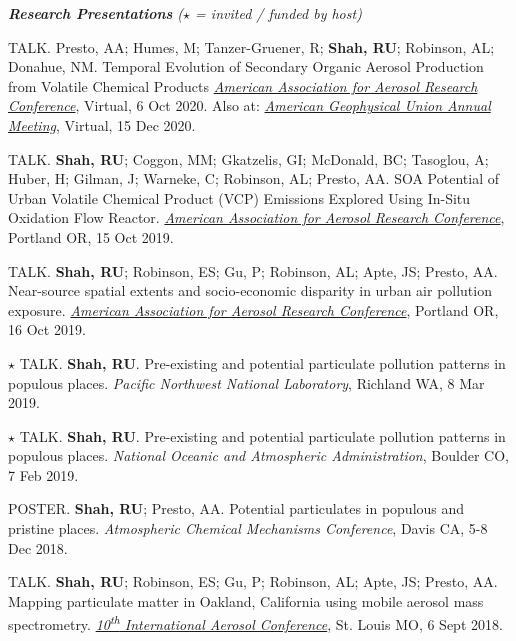 \documentclass{article}
\begin{document}
\hrulefill
\textit{\textbf{  Research Presentations} ({\Large $\star$} = invited / funded by host)  }
\hrulefill
\begin{etaremune}
\item {\tiny TALK.} Presto, AA; Humes, M; Tanzer-Gruener, R; \textbf{Shah, RU}; Robinson, AL; Donahue, NM. 
Temporal Evolution of Secondary Organic Aerosol Production from Volatile Chemical Products \href{http://aaarabstracts.com/2020/viewabstract.php?pid=52}{\textit{American Association for Aerosol Research Conference}}, Virtual, 6 Oct 2020. Also at: \href{https://agu.confex.com/agu/fm20/meetingapp.cgi/Paper/680476}{\textit{American Geophysical Union Annual Meeting}}, Virtual, 15 Dec 2020.
\item {\tiny TALK.} \textbf{Shah, RU}; Coggon, MM; Gkatzelis, GI; McDonald, BC; Tasoglou, A; Huber, H; Gilman, J; Warneke, C; Robinson, AL; Presto, AA. SOA Potential of Urban Volatile Chemical Product (VCP) Emissions Explored Using In-Situ Oxidation Flow Reactor. \href{http://aaarabstracts.com/2019/viewabstract.php?pid=329}{\textit{American Association for Aerosol Research Conference}}, Portland OR, 15 Oct 2019.
\item {\tiny TALK.} \textbf{Shah, RU};  Robinson, ES; Gu, P; Robinson, AL; Apte, JS; Presto, AA. Near-source spatial extents and socio-economic disparity in urban air pollution exposure. \href{http://aaarabstracts.com/2019/viewabstract.php?pid=322}{\textit{American Association for Aerosol Research Conference}}, Portland OR, 16 Oct 2019.
\item {\Large $\star$} {\tiny TALK.} \textbf{Shah, RU}. Pre-existing and potential particulate pollution patterns in populous places. \textit{Pacific Northwest National Laboratory}, Richland WA, 8 Mar 2019.
\item {\Large $\star$} {\tiny TALK.} \textbf{Shah, RU}. Pre-existing and potential particulate pollution patterns in populous places. \textit{National Oceanic and Atmospheric Administration}, Boulder CO, 7 Feb 2019.
\item {\tiny POSTER.} \textbf{Shah, RU}; Presto, AA. Potential particulates in populous and pristine places. \textit{Atmospheric Chemical Mechanisms Conference}, Davis CA, 5-8 Dec 2018.
\item {\tiny TALK.} \textbf{Shah, RU}; Robinson, ES; Gu, P; Robinson, AL; Apte, JS; Presto, AA. Mapping particulate matter in Oakland, California using mobile aerosol mass spectrometry. \href{http://aaarabstracts.com/2018IAC/viewabstract.php?pid=1032}{\textit{10\textsuperscript{th} International Aerosol Conference}}, St. Louis MO, 6 Sept 2018.

\end{etaremune}
\end{document}
